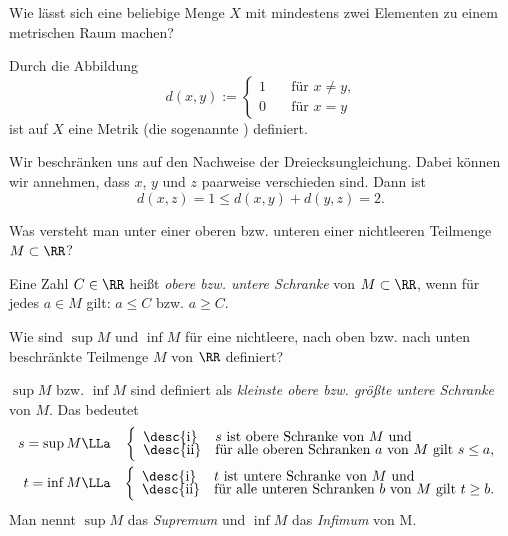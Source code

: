 \begin{frage}
  Wie lässt sich eine beliebige Menge $X$ mit mindestens zwei Elementen 
  zu einem metrischen Raum machen?
\end{frage}

\begin{antwort}
  Durch die Abbildung 
  \[
  d(x,y) := \left\{ \begin{array}{ll} 
      1\quad & \text{für $x\not=y$,} \\
      0\quad & \text{für $x=y$} \end{array} \right.
  \]
  ist auf $X$ eine Metrik (die sogenannte )
   definiert.

  Wir beschränken uns auf den Nachweise der Dreiecksungleichung. Dabei können 
  wir annehmen, dass $x$, $y$ und $z$ paarweise verschieden sind. Dann ist
  \[
  d(x,z) = 1 \le d(x,y) + d(y,z) = 2. 
  \]
  \AntEnd
\end{antwort}

\begin{frage}
  Was versteht man unter einer oberen bzw. unteren  
  einer nichtleeren Teilmenge $M\subset\RR$?
\end{frage}

\begin{antwort}  
  Eine Zahl $C\in \RR$ heißt 
  \textit{obere bzw. untere Schranke}
  von $M\subset \RR$, 
  wenn für jedes $a\in M$ gilt: $a\le C$ bzw. $a\ge C$.\AntEnd
\end{antwort} 

\begin{frage}
  Wie sind $\sup M$  und 
  $\inf M$ 
  für eine nichtleere, nach oben 
  bzw. nach unten beschränkte Teilmenge $M$ von $\RR$ definiert?
\end{frage}

\begin{antwort}
  $\sup M$ bzw. $\inf M$ sind definiert als \textit{kleinste 
    obere bzw. größte untere Schranke} von $M$. Das bedeutet
  \begin{eqnarray*}
    s = \sup M &\LLa & \left\{ \begin{array}{ll}
        \text{\desc{i}} &  \text{$s$ ist obere Schranke von $M$ und} \\[-1mm]
        \text{\desc{ii}} & \text{für alle oberen Schranken $a$ von $M$ gilt $s\le a$},
      \end{array} \right. 
    \\
    t = \inf M &\LLa& \left\{ \begin{array}{ll}
        \text{\desc{i}} & \text{$t$ ist untere Schranke von $M$ und} \\[-1mm]
        \text{\desc{ii}} & \text{für alle unteren Schranken $b$ von $M$ gilt $t\ge b$}.
      \end{array} \right. 
  \end{eqnarray*}
  Man nennt $\sup M$ das \textit{Supremum} und 
  $\inf M$ das \textit{Infimum} von M.
  \AntEnd
\end{antwort}

